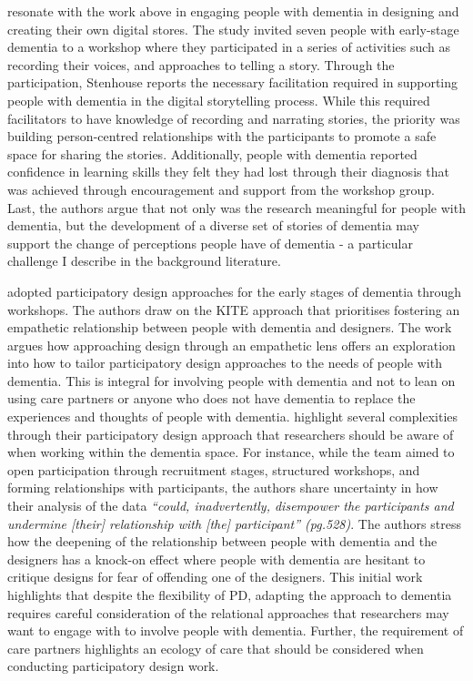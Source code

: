 \cite{stenhouse2013dangling} resonate with the work above in engaging people with dementia in designing and creating their own digital stores. The study invited seven people with early-stage dementia to a workshop where they participated in a series of activities such as recording their voices, and approaches to telling a story. Through the participation, Stenhouse reports the necessary facilitation required in supporting people with dementia in the digital storytelling process. While this required facilitators to have knowledge of recording and narrating stories, the priority was building person-centred relationships with the participants to promote a safe space for sharing the stories. Additionally, people with dementia reported confidence in learning skills they felt they had lost through their diagnosis that was achieved through encouragement and support from the workshop group. Last, the authors argue that not only was the research meaningful for people with dementia, but the development of a diverse set of stories of dementia may support the change of perceptions people have of dementia - a particular challenge I describe in the background literature. 

\cite{lindsay_empathy_2012} adopted participatory design approaches for the early stages of dementia through workshops. The authors draw on the KITE approach that prioritises fostering an empathetic relationship between people with dementia and designers. The work argues how approaching design through an empathetic lens offers an exploration into how to tailor participatory design approaches to the needs of people with dementia. This is integral for involving people with dementia and not to lean on using care partners or anyone who does not have dementia to replace the experiences and thoughts of people with dementia. \cite{lindsay_empathy_2012}  highlight several complexities through their participatory design approach that researchers should be aware of when working within the dementia space. For instance, while the team aimed to open participation through recruitment stages, structured workshops, and forming relationships with participants, the authors share uncertainty in how their analysis of the data \textit{``could, inadvertently, disempower the participants and undermine [their] relationship with [the] participant'' (pg.528)}. The authors stress how the deepening of the relationship between people with dementia and the designers has a knock-on effect where people with dementia are hesitant to critique designs for fear of offending one of the designers. This initial work highlights that despite the flexibility of PD, adapting the approach to dementia requires careful consideration of the relational approaches that researchers may want to engage with to involve people with dementia. Further, the requirement of care partners highlights an ecology of care that should be considered when conducting participatory design work.

